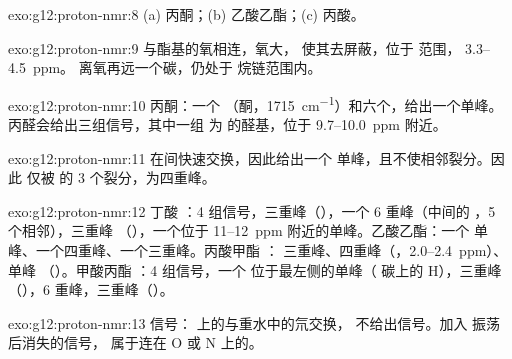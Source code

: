 \begin{solution}{exo:g12:proton-nmr:8}
(a) 丙酮；(b) 乙酸乙酯；(c) 丙酸。
\end{solution}

\begin{solution}{exo:g12:proton-nmr:9}
 与酯基的氧相连，氧大，
使其去屏蔽，位于  范围，
3.3--\qty{4.5}{ppm}。 离氧再远一个碳，仍处于
烷链范围内。
\end{solution}

\begin{solution}{exo:g12:proton-nmr:10}
丙酮：一个 （酮，\qty{1715}{cm^{-1}}）和六个，给出一个单峰。丙醛会给出三组信号，其中一组
为  的醛基，位于 9.7--\qty{10.0}{ppm} 附近。
\end{solution}

\begin{solution}{exo:g12:proton-nmr:11}
 在间快速交换，因此给出一个
单峰，且不使相邻裂分。因此 
仅被  的 3 个裂分，为四重峰。
\end{solution}

\begin{solution}{exo:g12:proton-nmr:12}
丁酸 ：4 组信号，三重峰（），一个
6 重峰（中间的 ，5 个相邻），三重峰
（），一个位于 11--\qty{12}{ppm} 附近的单峰。乙酸乙酯：一个
单峰、一个四重峰、一个三重峰。丙酸甲酯 ：
三重峰、四重峰（，2.0--\qty{2.4}{ppm}）、单峰
（）。甲酸丙酯 ：4 组信号，一个
位于最左侧的单峰（ 碳上的 H），三重峰
（），6 重峰，三重峰（）。
\end{solution}

\begin{solution}{exo:g12:proton-nmr:13}
 信号： 上的与重水中的氘交换，
 不给出信号。加入  振荡后消失的信号，
属于连在 O 或 N 上的。
\end{solution}

